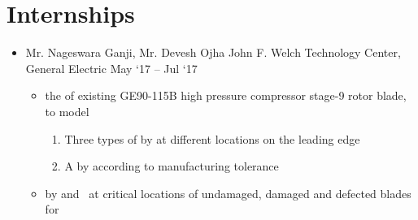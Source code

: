 \documentclass[a4paper,10pt]{article}
\begin{document}
\begin{itemize}
\end{itemize}
\section{Internships}
\begin{itemize}
	\item {}
	{Mr. Nageswara Ganji, Mr. Devesh Ojha}
	{John F. Welch Technology Center, General Electric}
	{May `17 -- Jul `17}
	\begin{itemize}
		\item {} the  of existing GE90-115B high pressure compressor stage-9 rotor blade, to model
		\begin{enumerate}
			\item Three types of  by  at different locations on the leading edge
			\item A  by  according to manufacturing tolerance
		\end{enumerate}
		\item {} by  and \ at critical locations of undamaged, damaged and defected blades for 
	\end{itemize}
\end{itemize}
\end{document}
